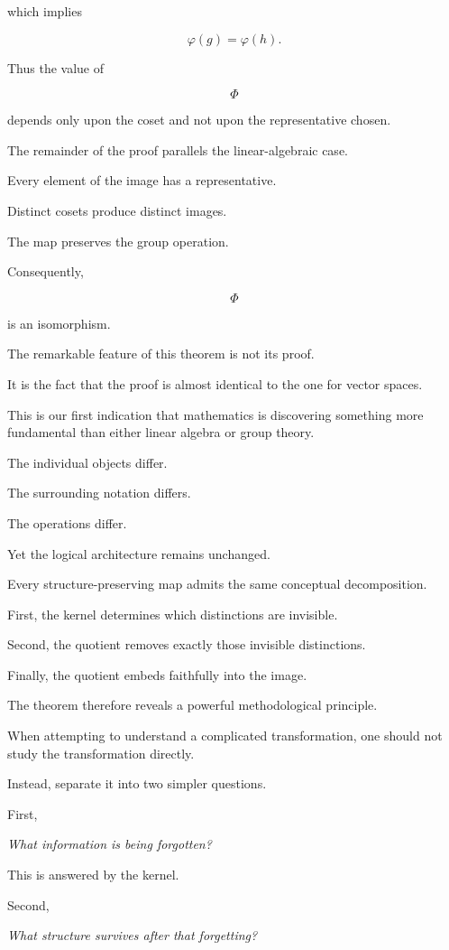 \documentclass[11pt]{book}
\numberwithin{equation}{chapter}
\theoremstyle{definition}
\theoremstyle{plain}
\theoremstyle{remark}
\begin{document}
which implies

\[
\varphi(g)
=
\varphi(h).
\]

Thus the value of

\[
\Phi
\]

depends only upon the coset and not upon the representative chosen.

The remainder of the proof parallels the linear-algebraic case.

Every element of the image has a representative.

Distinct cosets produce distinct images.

The map preserves the group operation.

Consequently,

\[
\Phi
\]

is an isomorphism.

The remarkable feature of this theorem is not its proof.

It is the fact that the proof is almost identical to the one for vector spaces.

This is our first indication that mathematics is discovering something more fundamental than either linear algebra or group theory.

The individual objects differ.

The surrounding notation differs.

The operations differ.

Yet the logical architecture remains unchanged.

Every structure-preserving map admits the same conceptual decomposition.

First, the kernel determines which distinctions are invisible.

Second, the quotient removes exactly those invisible distinctions.

Finally, the quotient embeds faithfully into the image.

The theorem therefore reveals a powerful methodological principle.

When attempting to understand a complicated transformation, one should not study the transformation directly.

Instead, separate it into two simpler questions.

First,

\emph{What information is being forgotten?}

This is answered by the kernel.

Second,

\emph{What structure survives after that forgetting?}
\end{document}
